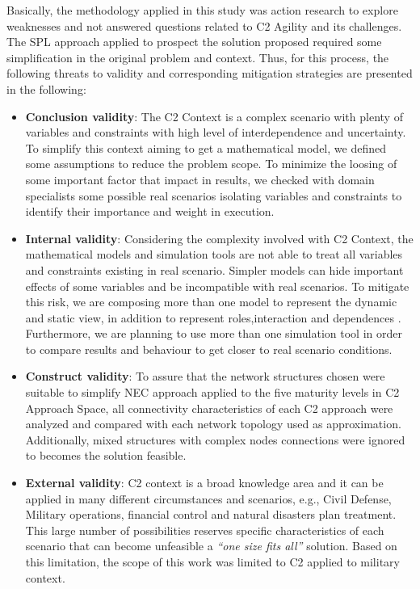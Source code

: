 
Basically, the methodology applied in this study was action research to explore weaknesses and not answered questions related to C2 Agility and its challenges. The SPL approach applied to prospect the solution proposed required some simplification in the original problem and context. Thus, for this process, the following threats to validity and corresponding mitigation strategies are presented in the following: 

\begin{itemize}
   \item \textbf{Conclusion validity}: The C2 Context is a complex scenario with plenty of variables and constraints with high level of interdependence and uncertainty. To simplify this context aiming to get a mathematical model, we defined some assumptions to reduce the problem scope. To minimize the loosing of some important factor that impact in results, we checked with domain specialists some possible real scenarios isolating variables and constraints to identify their importance and weight in execution.
   
   \item \textbf{Internal validity}: Considering the complexity involved with C2 Context, the mathematical models and simulation tools are not able to treat all variables and constraints existing in real scenario. Simpler models can hide important effects of some variables and be incompatible with real scenarios. To mitigate this risk, we are composing more than one model to represent the dynamic and static view, in addition to represent roles,interaction and dependences . Furthermore, we are planning to use more than one simulation tool in order to compare results and behaviour to get closer to real scenario conditions.
   
   \item \textbf{Construct validity}: To assure that the network structures chosen were suitable to simplify NEC approach applied to the five maturity levels in C2 Approach Space, all connectivity characteristics of each C2 approach were analyzed and compared with each network topology used as approximation. Additionally, mixed structures with complex nodes connections were ignored to becomes the solution feasible.
   
   
   \item \textbf{External validity}: C2 context is a broad knowledge area and it can be applied in many different circumstances and scenarios, e.g., Civil Defense, Military operations, financial control and natural disasters plan treatment. This large number of possibilities reserves specific characteristics of each scenario that can become unfeasible a \textit{``one size fits all''} solution. Based on this limitation, the scope of this work was limited to C2 applied to military context.
\end{itemize}